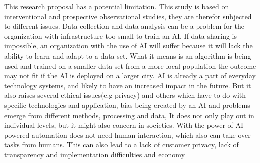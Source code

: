 \documentclass[fleqn,10pt]{wlscirep}
\begin{document}
This research proposal has a potential limitation. This study is based on interventional and prospective observational studies, they are therefor subjected to different issues. Data collection and data analysis can be a problem for the organization with infrastructure too small to train an AI. If data sharing is impossible, an organization with the use of AI will suffer because it will lack the ability to learn and adapt to a data set. What it means is an algorithm is being used and trained on a smaller data set from a more local population the outcome may not fit if the AI is deployed on a larger city. AI is already a part of everyday technology systems, and likely to have an increased impact in the future. But it also raises several ethical issues(e.g privacy) and others which have to do with specific technologies and application, bias being created by an AI and problems emerge from different methods, processing and data, It does not only play out in individual levels, but it might also concern in societies. With the power of AI-powered automation does not need human interaction, which also can take over tasks from humans. This can also lead to a lack of customer privacy, lack of transparency and implementation difficulties and economy 

\end{document}
